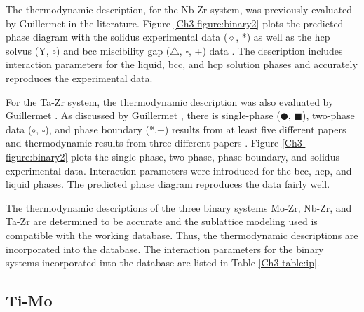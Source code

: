 The thermodynamic description, for the Nb-Zr system, was previously evaluated by Guillermet \cite{Guillermet1991} in the literature. Figure \ref{Ch3-figure:binary2} plots the predicted phase diagram with the solidus experimental data ($\diamond$, *) as well as the hcp solvus (Y, $\circ$) and bcc miscibility gap ($\bigtriangleup$, $\square$, +) data \cite{Guillermet1991,Kumar1994a,Abriata1982}. The description includes interaction parameters for the liquid, bcc, and hcp solution phases and accurately reproduces the experimental data. 

For the Ta-Zr system, the thermodynamic description was also evaluated by Guillermet \cite{Guillermet1995}. As discussed by Guillermet \cite{Guillermet1995}, there is single-phase ($\CIRCLE$, $\blacksquare$), two-phase data ($\circ$, $\square$), and phase boundary (*,+) results from at least five different papers and thermodynamic results from three different papers \cite{Guillermet1995}. Figure \ref{Ch3-figure:binary2} plots the single-phase, two-phase, phase boundary, and solidus experimental data. Interaction parameters were introduced for the bcc, hcp, and liquid phases. The predicted phase diagram reproduces the data fairly well. 

The thermodynamic descriptions of the three binary systems Mo-Zr, Nb-Zr, and Ta-Zr are determined to be accurate and the sublattice modeling used is compatible with the working database. Thus, the thermodynamic descriptions are incorporated into the database. The interaction parameters for the binary systems incorporated into the database are listed in Table \ref{Ch3-table:ip}. 

\subsection{Ti-Mo}

